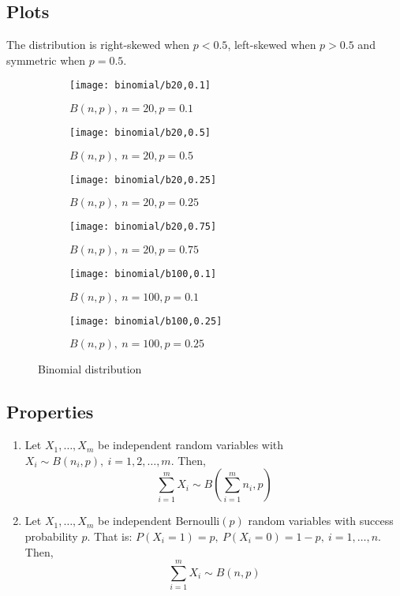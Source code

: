 \subsection{Plots}
The distribution is right-skewed when $p < 0.5$, left-skewed when $p > 0.5$ and symmetric when $p = 0.5$.

\begin{figure}[H]
	\centering
	\begin{subfigure}[b]{0.45\textwidth}
		\texttt{[image: binomial/b20,0.1]}
		\caption{$B(n, p), \ n = 20, p = 0.1$}
		\label{fig:B(20,0.1)}
	\end{subfigure}
	\begin{subfigure}[b]{0.45\textwidth}
	\texttt{[image: binomial/b20,0.5]}
	\caption{$B(n, p), \ n = 20, p = 0.5$}
	\label{fig:B(20,0.5)}
	\end{subfigure}
	\begin{subfigure}[b]{0.45\textwidth}
		\texttt{[image: binomial/b20,0.25]}
		\caption{$B(n, p), \ n = 20, p = 0.25$}
		\label{fig:B(20,0.25)}
	\end{subfigure}
	\begin{subfigure}[b]{0.45\textwidth}
		\texttt{[image: binomial/b20,0.75]}
		\caption{$B(n, p), \ n = 20, p = 0.75$}
		\label{fig:B(20,0.75)}
	\end{subfigure}
	\begin{subfigure}[b]{0.45\textwidth}
		\texttt{[image: binomial/b100,0.1]}
		\caption{$B(n, p), \ n = 100, p = 0.1$}
		\label{fig:B(100,0.1)}
	\end{subfigure}
	\begin{subfigure}[b]{0.45\textwidth}
		\texttt{[image: binomial/b100,0.25]}
		\caption{$B(n, p), \ n = 100, p = 0.25$}
		\label{fig:B(100,0.25)}
	\end{subfigure}
	\caption{Binomial distribution}\label{fig:binomial}
\end{figure}

\subsection{Properties}
\begin{enumerate}
	\item Let $X_1, \ldots, X_m$ be independent random variables with $X_i \sim B(n_i, p), \ i = 1, 2, \ldots, m$. Then,
	\[
	\sum_{i = 1}^m X_i \sim B\left(\sum_{i = 1}^m n_i, p\right)
	\]
	\item Let $X_1, \ldots, X_m$ be independent Bernoulli$(p)$ random variables with success probability $p$. That is: $P(X_i = 1) = p, \ P(X_i = 0) = 1 - p, \ i = 1, \ldots, n$. Then,
	\[
	\sum_{i = 1}^m X_i \sim B\left(n, p\right)
	\]
\end{enumerate}

